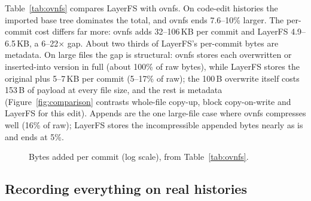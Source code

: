\documentclass[letterpaper,twocolumn,10pt]{article}
\newcommand{\sys}{LayerFS}
\newcommand{\X}{$\times$}
\begin{document}
Table~\ref{tab:ovnfs} compares \sys{} with ovnfs. On code-edit histories
the imported base tree dominates the total, and ovnfs ends 7.6--10\% larger.
The per-commit cost differs far more: ovnfs adds 32--106\,KB per commit and
\sys{} 4.9--6.5\,KB, a 6--22\X{} gap. About two thirds of \sys{}'s
per-commit bytes are metadata. On large files the gap is structural: ovnfs
stores each overwritten or inserted-into version in full (about 100\% of raw
bytes), while \sys{} stores the original plus 5--7\,KB per commit (5--17\%
of raw); the 100\,B overwrite itself costs 153\,B of payload at every file
size, and the rest is metadata (Figure~\ref{fig:comparison} contrasts
whole-file copy-up, block copy-on-write and \sys{} for this edit). Appends are the one large-file case where ovnfs compresses well
(16\% of raw); \sys{} stores the incompressible appended bytes nearly as is
and ends at 5\%.

\begin{figure}[t]
\centering
{}
\caption{Bytes added per commit (log scale), from Table~\ref{tab:ovnfs}.}
\label{fig:percommit}
\end{figure}

\subsection{Recording everything on real histories}
\label{sec:eval-history}
\end{document}
